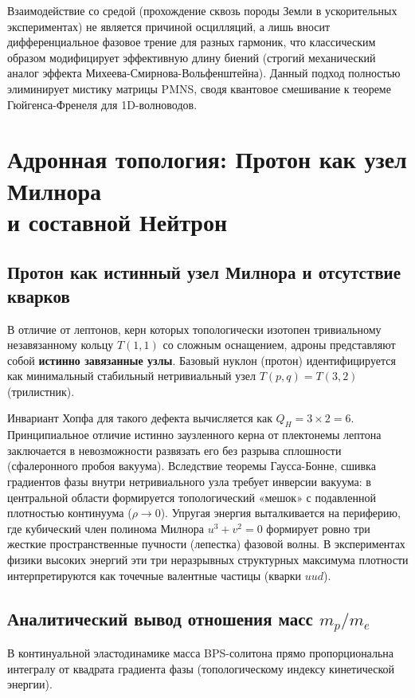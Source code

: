 \documentclass[11pt,a4paper]{article}
\begin{document}
	Взаимодействие со средой (прохождение сквозь породы Земли в ускорительных экспериментах) не является причиной осцилляций, а лишь вносит дифференциальное фазовое трение для разных гармоник, что классическим образом модифицирует эффективную длину биений (строгий механический аналог эффекта Михеева-Смирнова-Вольфенштейна). Данный подход полностью элиминирует мистику матрицы PMNS, сводя квантовое смешивание к теореме Гюйгенса-Френеля для 1D-волноводов.
	
	\section{Адронная топология: Протон как узел Милнора\\ и составной Нейтрон}
	
	\subsection{Протон как истинный узел Милнора и отсутствие кварков}
	В отличие от лептонов, керн которых топологически изотопен тривиальному незавязанному кольцу $T(1,1)$ со сложным оснащением, адроны представляют собой \textbf{истинно завязанные узлы}. 
	Базовый нуклон (протон) идентифицируется как минимальный стабильный нетривиальный узел $T(p,q) = T(3,2)$ (трилистник).
	
	Инвариант Хопфа для такого дефекта вычисляется как $Q_H = 3 \times 2 = 6$. 
	Принципиальное отличие истинно заузленного керна от плектонемы лептона заключается в невозможности развязать его без разрыва сплошности (сфалеронного пробоя вакуума). Вследствие теоремы Гаусса-Бонне, сшивка градиентов фазы внутри нетривиального узла требует инверсии вакуума: в центральной области формируется топологический «мешок» с подавленной плотностью континуума ($\rho \to 0$).
	Упругая энергия выталкивается на периферию, где кубический член полинома Милнора $u^3+v^2=0$ формирует ровно три жесткие пространственные пучности (лепестка) фазовой волны. В экспериментах физики высоких энергий эти три неразрывных структурных максимума плотности интерпретируются как точечные валентные частицы (кварки $uud$).
	
	\subsection{Аналитический вывод отношения масс $m_p/m_e$}
	В континуальной эластодинамике масса BPS-солитона прямо пропорциональна интегралу от квадрата градиента фазы (топологическому индексу кинетической энергии). 
	
\end{document}
